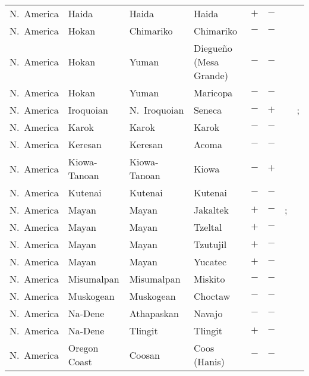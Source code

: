 \begin{landscape}
\begin{longtable}{l>{\raggedright\arraybackslash}p{2.2cm}>{\raggedright}p{2.5cm}>{\raggedright\arraybackslash}p{2.5cm}cc>{\raggedright\arraybackslash}p{3.4cm}>{\raggedright\arraybackslash}p{3.4cm}}
N.~America & Haida & Haida & Haida & $+$ & $-$ & \citealt{Gil2013} & \citealt{Corbett2013}\\
N.~America & Hokan & Chimariko & Chimariko & $-$ & $-$ & \citealt{Gil2013} & \citealt{Corbett2013}\\
N.~America & Hokan & Yuman & Diegueño (Mesa Grande) & $-$ & $-$ & \citealt[299]{Nichols1992} & \citealt[299]{Nichols1992}\\
N.~America & Hokan & Yuman & Maricopa & $-$ & $-$ & \citealt{Gil2013} & \citealt{Corbett2013}\\
N.~America & Iroquoian & N.~Iroquoian & Seneca & $-$ & $+$ & \citealt{Gil2013} & \citealt{Corbett2013}; \citealt[13--22]{Chafe1967}\\
N.~America & Karok & Karok & Karok & $-$ & $-$ & \citealt{Gil2013} & \citealt{Corbett2013}\\
N.~America & Keresan & Keresan & Acoma & $-$ & $-$ & \citealt{Gil2013} & \citealt{Corbett2013}\\
N.~America & Kiowa-Tanoan & Kiowa-Tanoan & Kiowa & $-$ & $+$ & \citealt{Gil2013} & \citealt[59--67]{Sutton2010}\\
N.~America & Kutenai & Kutenai & Kutenai & $-$ & $-$ & \citealt{Gil2013} & \citealt{Corbett2013}\\
N.~America & Mayan & Mayan & Jakaltek & $+$ & $-$ & \citealt{Gil2013}; \citealt[244]{Craig1986} & \citealt[passim]{Day1973}\\
N.~America & Mayan & Mayan & Tzeltal & $+$ & $-$ & \citealt{Gil2013} & \citealt[171--172]{Kaufman1963}\\
N.~America & Mayan & Mayan & Tzutujil & $+$ & $-$ & \citealt[301]{Nichols1992} & \citealt[301]{Nichols1992}\\
N.~America & Mayan & Mayan & Yucatec & $+$ & $-$ & \citealt{Gil2013} & \citealt[66, 69]{Brody2004}\\
N.~America & Misumalpan & Misumalpan & Miskito & $-$ & $-$ & \citealt{Gil2013} & \citealt[56]{Heath1913}\\
N.~America & Muskogean & Muskogean & Choctaw & $-$ & $-$ & \citealt{Gil2013} & \citealt[passim]{Davies1986}\\
N.~America & Na-Dene & Athapaskan & Navajo & $-$ & $-$ & \citealt{Gil2013} & \citealt[299]{Nichols1992}\\
N.~America & Na-Dene & Tlingit & Tlingit & $+$ & $-$ & \citealt{Gil2013} & \citealt[passim]{Boas1917}\\
N.~America & Oregon Coast & Coosan & Coos (Hanis) & $-$ & $-$ & \citealt{Gil2013} & \citealt{Corbett2013}\\

\end{longtable}
\end{landscape}
